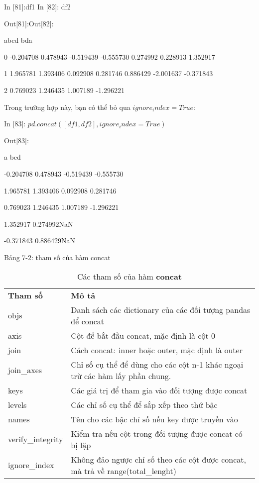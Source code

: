 \par\quad\textup In [81]:\quad\quad\quad\quad df1 In [82]: df2
\par\quad\textup Out[81]:\quad\quad\quad\quad\quad\quad\quad\quad\quad\quad\quad\quad\quad\quad\quad\quad Out[82]:
\par\quad\textup \quad\quad\quad\quad a\quad\quad b\quad\quad\quad\quad c\quad\quad\quad\quad d \quad\quad\quad\quad\quad\quad b\quad\quad\quad\quad d\quad\quad\quad\quad a
\par\quad\textup 0 -0.204708 0.478943 -0.519439 -0.555730\quad{} 0.274992 0.228913 1.352917
\par\quad\textup 1 1.965781 1.393406 0.092908  0.281746\quad\quad{} 0.886429 -2.001637 -0.371843
\par\quad\textup 2 0.769023 1.246435 1.007189 -1.296221
\par\quad\textup Trong trường hợp này, bạn có thể bỏ qua $ignore_index=True$:
\par\quad\textup In [83]: $pd.concat([df1, df2], ignore_index=True)$
\par\quad\textup Out[83]:
\par\quad\quad\quad\quad\quad a \quad\quad\quad b\quad\quad\quad  c\quad\quad\quad  d
\par{} -0.204708 0.478943 -0.519439 -0.555730
\par{} 1.965781 1.393406 0.092908 0.281746
\par{} 0.769023 1.246435 1.007189 -1.296221
\par{} 1.352917 0.274992\quad NaN\quad{}
\par{} -0.371843 0.886429\quad NaN\quad{} \\ \par
\quad\textup{Bảng 7-2: tham số của hàm concat}
\begin{table}[h]
\centering
    \begin{tabular}{l|p{10cm}}
      \textbf{ Tham số}  & \textbf{Mô tả} \\
objs & Danh sách các dictionary của các đối tượng pandas để concat \\ 
axis & Cột để bắt đầu concat, mặc định là cột 0 \\
join  & Cách concat: inner hoặc outer, mặc định là outer  \\
join\_axes     &  Chỉ số cụ thể để dùng cho các cột n-1 khác ngoại trừ các hàm lấy phần chung.\\
keys   & Các giá trị để tham gia vào đối tượng được concat \\
levels & Các chỉ số cụ thể để sắp xếp theo thứ bậc   \\
names   &  Tên cho các bậc chỉ số nếu key được truyền vào \\
verify\_integrity  & Kiểm tra nếu cột trong đối tượng được concat có bị lặp \\
ignore\_index  & Không đảo ngược chỉ số theo các cột được concat, mà trả về range(total\_lenght)
\end{tabular}
    \caption{Các tham số của hàm \textbf{concat}}
    \label{tab:table2}
\end{table}
